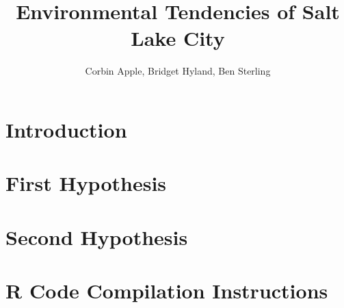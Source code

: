 \documentclass[final]{siamart1116}
\title{Environmental Tendencies of Salt Lake City}
\author{Corbin Apple, Bridget Hyland, Ben Sterling}
\begin{document}
\maketitle

\section{Introduction}


\section{First Hypothesis}


\section{Second Hypothesis}


\section{R Code Compilation Instructions}






\end{document}
